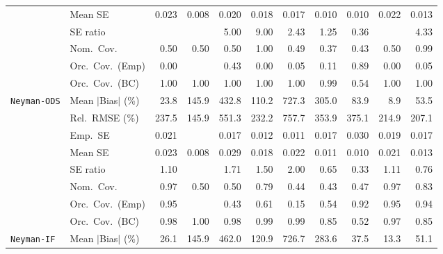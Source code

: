 \begin{landscape}
\begin{longtable}{llrrrrrrrrr}
 & Mean SE & 0.023 & 0.008 & 0.020 & 0.018 & 0.017 & 0.010 & 0.010 & 0.022 & 0.013 \\
 & SE ratio &  &  & 5.00 & 9.00 & \cellcolor{rankthree}2.43 & \cellcolor{rankone}1.25 & \cellcolor{ranktwo}0.36 &  & 4.33 \\
 & Nom.\ Cov. & \cellcolor{ranktwo}0.50 & \cellcolor{ranktwo}0.50 & \cellcolor{ranktwo}0.50 & \cellcolor{rankone}1.00 & \cellcolor{rankthree}0.49 & 0.37 & 0.43 & \cellcolor{ranktwo}0.50 & \cellcolor{rankone}0.99 \\
 & Orc.\ Cov.\ (Emp) & 0.00 &  & \cellcolor{ranktwo}0.43 & 0.00 & 0.05 & \cellcolor{rankthree}0.11 & \cellcolor{rankone}0.89 & 0.00 & 0.05 \\
 & Orc.\ Cov.\ (BC) & \cellcolor{ranktwo}1.00 & \cellcolor{ranktwo}1.00 & \cellcolor{ranktwo}1.00 & \cellcolor{ranktwo}1.00 & \cellcolor{ranktwo}1.00 & \cellcolor{rankone}0.99 & \cellcolor{rankthree}0.54 & \cellcolor{ranktwo}1.00 & \cellcolor{ranktwo}1.00 \\
\addlinespace[2pt]
\quad \texttt{Neyman-ODS} & Mean $|$Bias$|$ (\%) & \cellcolor{ranktwo}23.8 & 145.9 & 432.8 & 110.2 & 727.3 & 305.0 & 83.9 & \cellcolor{rankone}8.9 & \cellcolor{rankthree}53.5 \\
 & Rel.\ RMSE (\%) & 237.5 & \cellcolor{rankone}145.9 & 551.3 & 232.2 & 757.7 & 353.9 & 375.1 & \cellcolor{rankthree}214.9 & \cellcolor{ranktwo}207.1 \\
 & Emp.\ SE & 0.021 &  & 0.017 & 0.012 & 0.011 & 0.017 & 0.030 & 0.019 & 0.017 \\
 & Mean SE & 0.023 & 0.008 & 0.029 & 0.018 & 0.022 & 0.011 & 0.010 & 0.021 & 0.013 \\
 & SE ratio & \cellcolor{rankone}1.10 &  & 1.71 & 1.50 & 2.00 & 0.65 & 0.33 & \cellcolor{ranktwo}1.11 & \cellcolor{rankthree}0.76 \\
 & Nom.\ Cov. & \cellcolor{rankone}0.97 & 0.50 & 0.50 & \cellcolor{rankthree}0.79 & 0.44 & 0.43 & 0.47 & \cellcolor{rankone}0.97 & \cellcolor{ranktwo}0.83 \\
 & Orc.\ Cov.\ (Emp) & \cellcolor{rankone}0.95 &  & 0.43 & 0.61 & 0.15 & 0.54 & \cellcolor{rankthree}0.92 & \cellcolor{rankone}0.95 & \cellcolor{ranktwo}0.94 \\
 & Orc.\ Cov.\ (BC) & \cellcolor{ranktwo}0.98 & 1.00 & \cellcolor{ranktwo}0.98 & \cellcolor{rankthree}0.99 & 0.99 & 0.85 & 0.52 & \cellcolor{rankone}0.97 & 0.85 \\
\addlinespace[2pt]
\quad \texttt{Neyman-IF} & Mean $|$Bias$|$ (\%) & \cellcolor{ranktwo}26.1 & 145.9 & 462.0 & 120.9 & 726.7 & 283.6 & \cellcolor{rankthree}37.5 & \cellcolor{rankone}13.3 & 51.1 \\

\end{longtable}
\end{landscape}
